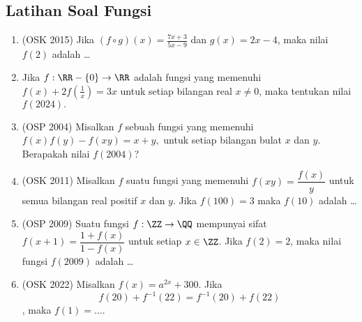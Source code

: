 \subsection{Latihan Soal Fungsi}
\begin{enumerate}
        \item (OSK 2015) Jika $(f \circ g)(x) = \frac{7x + 3}{5x - 9}$ dan $g(x) = 2x - 4$, maka nilai $f(2)$ adalah \ldots

        \item Jika $f:\RR-\{0\} \rightarrow \RR$ adalah fungsi yang memenuhi $f(x)+2f\left(\frac{1}{x}\right)=3x$ untuk setiap bilangan real $x \neq 0$, maka tentukan nilai $f(2024).$

        \item (OSP 2004) Misalkan $f$ sebuah fungsi yang memenuhi $f(x)f(y)-f(xy)=x+y,$ untuk setiap bilangan bulat $x$ dan $y$. Berapakah nilai $f(2004)$?
        
        \item (OSK 2011) Misalkan $f$ suatu fungsi yang memenuhi $f(xy) = \dfrac{f(x)}{y}$ untuk semua bilangan real positif $x$ dan $y$. Jika $f(100)=3$ maka $f(10)$ adalah \dots
        
        \item (OSP 2009) Suatu fungsi $f:\ZZ \rightarrow \QQ$ mempunyai sifat $f(x+1)=\dfrac{1+f(x)}{1-f(x)}$ untuk setiap $x \in \ZZ$. Jika $f(2)=2$, maka nilai fungsi $f(2009)$ adalah \dots

        \item (OSK 2022) Misalkan $f(x) = a^{2x} + 300$. Jika
        $$f(20) + f^{-1}(22) = f^{-1}(20) + f(22)$$,
        maka $f(1) = \dots$.

\end{enumerate}